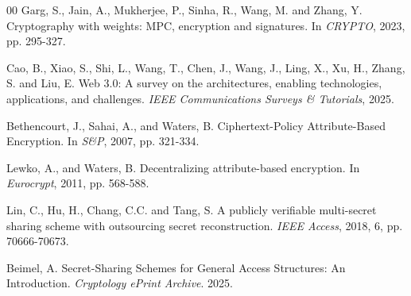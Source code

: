 \documentclass[runningheads]{llncs}
\begin{document}
\begin{thebibliography}{00}
Garg, S., Jain, A., Mukherjee, P., Sinha, R., Wang, M. and Zhang, Y. Cryptography with weights: MPC, encryption and signatures. In \textit{CRYPTO}, 2023, pp. 295-327.

Cao, B., Xiao, S., Shi, L., Wang, T., Chen, J., Wang, J., Ling, X., Xu, H., Zhang, S. and Liu, E. Web 3.0: A survey on the architectures, enabling technologies, applications, and challenges. \textit{IEEE Communications Surveys \& Tutorials}, 2025.




 Bethencourt, J., Sahai, A., and Waters, B. Ciphertext-Policy Attribute-Based Encryption. In \textit{S\&P}, 2007, pp. 321-334.

 Lewko, A., and Waters, B. Decentralizing attribute-based encryption. In \textit{Eurocrypt}, 2011, pp. 568-588.

Lin, C., Hu, H., Chang, C.C. and Tang, S. A publicly verifiable multi-secret sharing scheme with outsourcing secret reconstruction. \textit{IEEE Access}, 2018, 6, pp. 70666-70673.

Beimel, A. Secret-Sharing Schemes for General Access Structures: An Introduction. \textit{Cryptology ePrint Archive}. 2025.








\end{thebibliography}
\end{document}
